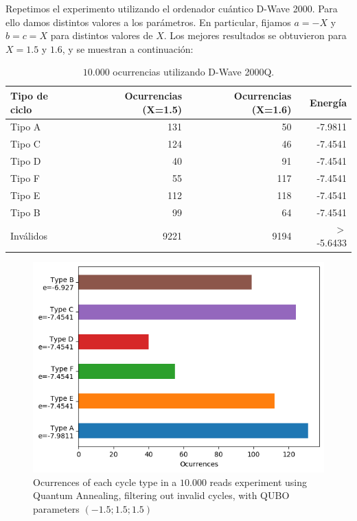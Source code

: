 \documentclass[11pt]{article}
\begin{document}
Repetimos el experimento utilizando el ordenador cuántico D-Wave 2000. Para ello damos distintos valores a los parámetros. En particular, fijamos $a=-X$ y $b=c=X$ para distintos valores de $X$. Los mejores resultados se obtuvieron para $X = 1.5$ y $1.6$, y se muestran a continuación:

\begin{table}[H]
	\centering
	\begin{tabular}{lrrr}
		\textbf{Tipo de ciclo} & \textbf{Ocurrencias (X=1.5)} & \textbf{Ocurrencias (X=1.6)} & \textbf{Energía} \\
		\hline
		Tipo A	& 131	& 50	& -7.9811	\\
		Tipo C	& 124	& 46	& -7.4541	\\
		Tipo D	& 40	& 91	& -7.4541	\\
		Tipo F	& 55	& 117	& -7.4541	\\
		Tipo E	& 112	& 118	& -7.4541	\\
		Tipo B	& 99	& 64	& -7.4541	\\    
		Inválidos & 9221	& 9194	& $>$ -5.6433                         
	\end{tabular}
	\caption{$10.000$ ocurrencias utilizando D-Wave 2000Q.}
	\label{tab:exp3}
\end{table}

\begin{figure}[H]
	\includegraphics[scale=0.75]{figures/experiment3 (1.5).png}
	\centering
	\caption{Ocurrences of each cycle type in a $10.000$ reads experiment using Quantum Annealing, filtering out invalid cycles, with QUBO parameters $(-1.5; 1.5; 1.5)$}
	\label{fig:exp3-occ1}
\end{figure}
\end{document}
